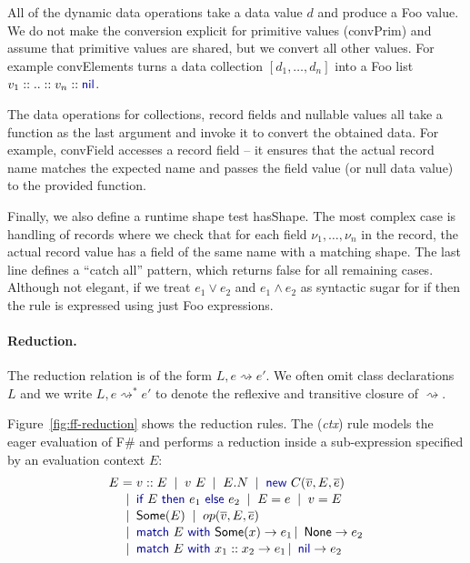 \documentclass[10pt,preprint,blind,clearpagebib]{sigplanconf}
\newcommand{\kvd}[1]{\textnormal{\textcolor{kvdclr}{\sffamily #1}}}
\newcommand{\ident}[1]{\textnormal{\sffamily #1}}
\newcommand{\lsep}[0]{\;\; | \;\;}
\newcommand{\narrow}[1]{\hspace{-0.7em} #1 \hspace{-0.7em}}
\newcommand{\reduce}{\rightsquigarrow}
\begin{document}
All of the dynamic data operations take a data value $d$ and produce a Foo value. We do not 
make the conversion explicit for primitive values (\ident{convPrim}) and assume that primitive
values are shared, but we convert all other values. For example \ident{convElements} turns a 
data collection $[d_1, \ldots, d_n]$ into a Foo list $v_1 :: .. :: v_n :: \kvd{nil}$.

The data operations for collections, record fields and nullable values all take a function
as the last argument and invoke it to convert the obtained data. For example, \ident{convField} 
accesses a record field -- it ensures that the actual record name matches the expected name and 
passes the field value (or \kvd{null} data value) to the provided function.

Finally, we also define a runtime shape test \ident{hasShape}.
The most complex case is handling of records where we check that for each field $\nu_1, \ldots, \nu_n$ 
in the record, the actual record value has a field of the same name with a matching shape. The last 
line defines a ``catch all'' pattern, which returns \kvd{false} for all remaining cases. Although
not elegant, if we treat $e_1 \vee e_2$ and $e_1 \wedge e_2$ as syntactic sugar for \kvd{if} then
the rule is expressed using just Foo expressions.


\paragraph{Reduction.}
The reduction relation is of the form $L, e \reduce e'$. We often omit class declarations 
$L$ and we write $L, e \reduce^{*} e'$ to denote 
the reflexive and transitive closure of $\reduce$. 

Figure~\ref{fig:ff-reduction} shows the reduction rules. The (\emph{ctx}) rule models the eager
evaluation of F\# and performs a reduction inside a sub-expression specified by an evaluation 
context $E$:
%
\begin{equation*}
\begin{array}{rcl}
 E &\narrow{=}& v::E \lsep v~E \lsep E.N \lsep \kvd{new}~C(\overline{v}, E, \overline{e})\\[0.1em]
   &\narrow{|}&  \kvd{if}~E~\kvd{then}~e_1~\kvd{else}~e_2  \lsep E = e \lsep v = E \\[0.1em]
   &\narrow{|}& \ident{Some}(E) \lsep op(\overline{v}, E, \overline{e})\\[0.1em]
   &\narrow{|}& \kvd{match}~E~\kvd{with}~\ident{Some}(x) \rightarrow e_1 \,|\, \ident{None} \rightarrow e_2 \\[0.1em]
   &\narrow{|}& \kvd{match}~E~\kvd{with}~x_1 :: x_2 \rightarrow e_1 \,|\, \kvd{nil} \rightarrow e_2
\end{array} 
\end{equation*}
\end{document}
